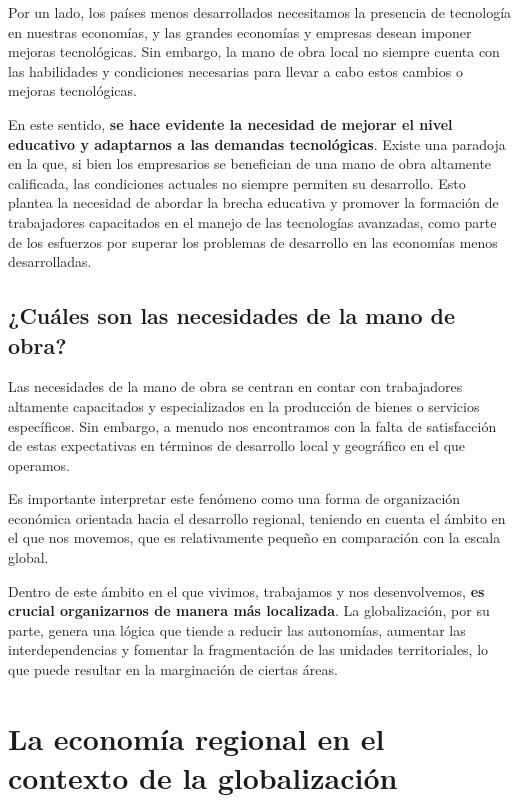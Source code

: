 \documentclass[
  letterpaper,
  DIV=11,
  numbers=noendperiod]{scrartcl}
\begin{document}
Por un lado, los países menos desarrollados necesitamos la presencia de
tecnología en nuestras economías, y las grandes economías y empresas
desean imponer mejoras tecnológicas. Sin embargo, la mano de obra local
no siempre cuenta con las habilidades y condiciones necesarias para
llevar a cabo estos cambios o mejoras tecnológicas.

En este sentido, \textbf{se hace evidente la necesidad de mejorar el
nivel educativo y adaptarnos a las demandas tecnológicas}. Existe una
paradoja en la que, si bien los empresarios se benefician de una mano de
obra altamente calificada, las condiciones actuales no siempre permiten
su desarrollo. Esto plantea la necesidad de abordar la brecha educativa
y promover la formación de trabajadores capacitados en el manejo de las
tecnologías avanzadas, como parte de los esfuerzos por superar los
problemas de desarrollo en las economías menos desarrolladas.

\hypertarget{cuuxe1les-son-las-necesidades-de-la-mano-de-obra}{%
\subsection{¿Cuáles son las necesidades de la mano de
obra?}\label{cuuxe1les-son-las-necesidades-de-la-mano-de-obra}}

Las necesidades de la mano de obra se centran en contar con trabajadores
altamente capacitados y especializados en la producción de bienes o
servicios específicos. Sin embargo, a menudo nos encontramos con la
falta de satisfacción de estas expectativas en términos de desarrollo
local y geográfico en el que operamos.

Es importante interpretar este fenómeno como una forma de organización
económica orientada hacia el desarrollo regional, teniendo en cuenta el
ámbito en el que nos movemos, que es relativamente pequeño en
comparación con la escala global.

Dentro de este ámbito en el que vivimos, trabajamos y nos desenvolvemos,
\textbf{es crucial organizarnos de manera más localizada}. La
globalización, por su parte, genera una lógica que tiende a reducir las
autonomías, aumentar las interdependencias y fomentar la fragmentación
de las unidades territoriales, lo que puede resultar en la marginación
de ciertas áreas.

\hypertarget{la-economuxeda-regional-en-el-contexto-de-la-globalizaciuxf3n}{%
\section{La economía regional en el contexto de la
globalización}\label{la-economuxeda-regional-en-el-contexto-de-la-globalizaciuxf3n}}
\end{document}
